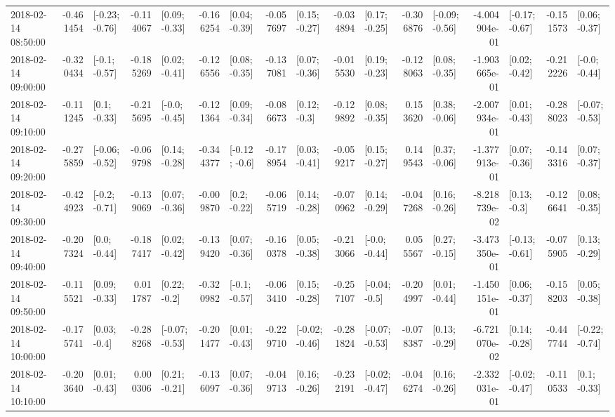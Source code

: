 \begin{tabular}{lrlrlrlrlrlrlrlrl}
2018-02-14 08:50:00 & -0.461454 &  [-0.23; -0.76] & -0.114067 &   [0.09; -0.33] & -0.166254 &   [0.04; -0.39] & -0.057697 &   [0.15; -0.27] & -0.034894 &   [0.17; -0.25] & -0.306876 &  [-0.09; -0.56] & -4.004904e-01 &  [-0.17; -0.67] & -0.151573 &   [0.06; -0.37] \\
2018-02-14 09:00:00 & -0.320434 &   [-0.1; -0.57] & -0.185269 &   [0.02; -0.41] & -0.126556 &   [0.08; -0.35] & -0.137081 &   [0.07; -0.36] & -0.015530 &   [0.19; -0.23] & -0.128063 &   [0.08; -0.35] & -1.903665e-01 &   [0.02; -0.42] & -0.212226 &   [-0.0; -0.44] \\
2018-02-14 09:10:00 & -0.111245 &    [0.1; -0.33] & -0.215695 &   [-0.0; -0.45] & -0.121364 &   [0.09; -0.34] & -0.086673 &    [0.12; -0.3] & -0.129892 &   [0.08; -0.35] &  0.153620 &   [0.38; -0.06] & -2.007934e-01 &   [0.01; -0.43] & -0.288023 &  [-0.07; -0.53] \\
2018-02-14 09:20:00 & -0.275859 &  [-0.06; -0.52] & -0.069798 &   [0.14; -0.28] & -0.344377 &   [-0.12; -0.6] & -0.178954 &   [0.03; -0.41] & -0.059217 &   [0.15; -0.27] &  0.149543 &   [0.37; -0.06] & -1.377913e-01 &   [0.07; -0.36] & -0.143316 &   [0.07; -0.37] \\
2018-02-14 09:30:00 & -0.424923 &   [-0.2; -0.71] & -0.139069 &   [0.07; -0.36] & -0.009870 &    [0.2; -0.22] & -0.065719 &   [0.14; -0.28] & -0.070962 &   [0.14; -0.29] & -0.047268 &   [0.16; -0.26] & -8.218739e-02 &    [0.13; -0.3] & -0.126641 &   [0.08; -0.35] \\
2018-02-14 09:40:00 & -0.207324 &    [0.0; -0.44] & -0.187417 &   [0.02; -0.42] & -0.139420 &   [0.07; -0.36] & -0.160378 &   [0.05; -0.38] & -0.213066 &   [-0.0; -0.44] &  0.055567 &   [0.27; -0.15] & -3.473350e-01 &  [-0.13; -0.61] & -0.075905 &   [0.13; -0.29] \\
2018-02-14 09:50:00 & -0.115521 &   [0.09; -0.33] &  0.011787 &    [0.22; -0.2] & -0.320982 &   [-0.1; -0.57] & -0.063410 &   [0.15; -0.28] & -0.257107 &   [-0.04; -0.5] & -0.204997 &   [0.01; -0.44] & -1.450151e-01 &   [0.06; -0.37] & -0.158203 &   [0.05; -0.38] \\
2018-02-14 10:00:00 & -0.175741 &    [0.03; -0.4] & -0.288268 &  [-0.07; -0.53] & -0.201477 &   [0.01; -0.43] & -0.229710 &  [-0.02; -0.46] & -0.281824 &  [-0.07; -0.53] & -0.078387 &   [0.13; -0.29] & -6.721070e-02 &   [0.14; -0.28] & -0.447744 &  [-0.22; -0.74] \\
2018-02-14 10:10:00 & -0.203640 &   [0.01; -0.43] &  0.000306 &   [0.21; -0.21] & -0.136097 &   [0.07; -0.36] & -0.049713 &   [0.16; -0.26] & -0.232191 &  [-0.02; -0.47] & -0.046274 &   [0.16; -0.26] & -2.332031e-01 &  [-0.02; -0.47] & -0.110533 &    [0.1; -0.33] \\

\end{tabular}
